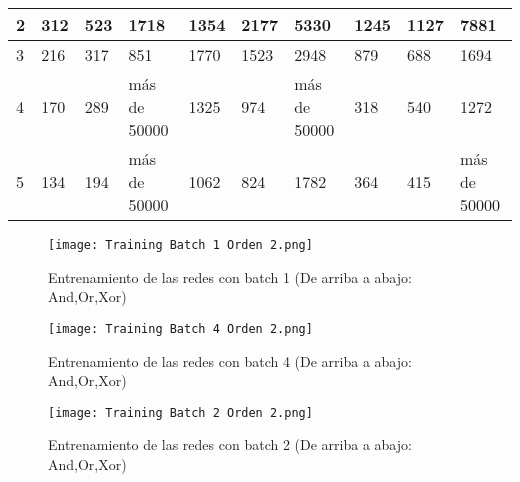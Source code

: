 \begin{table}[H]
\begin{tabular}{|l|lllllllll|}
    2                                                      & \multicolumn{1}{l|}{312}          & \multicolumn{1}{l|}{523}         & \multicolumn{1}{l|}{1718}         & \multicolumn{1}{l|}{1354}         & \multicolumn{1}{l|}{2177}        & \multicolumn{1}{l|}{5330}         & \multicolumn{1}{l|}{1245}         & \multicolumn{1}{l|}{1127}        & 7881         \\ \hline
    3                                                      & \multicolumn{1}{l|}{216}          & \multicolumn{1}{l|}{317}         & \multicolumn{1}{l|}{851}          & \multicolumn{1}{l|}{1770}         & \multicolumn{1}{l|}{1523}        & \multicolumn{1}{l|}{2948}         & \multicolumn{1}{l|}{879}          & \multicolumn{1}{l|}{688}         & 1694         \\ \hline
    4                                                      & \multicolumn{1}{l|}{170}          & \multicolumn{1}{l|}{289}         & \multicolumn{1}{l|}{más de 50000} & \multicolumn{1}{l|}{1325}         & \multicolumn{1}{l|}{974}         & \multicolumn{1}{l|}{más de 50000} & \multicolumn{1}{l|}{318}          & \multicolumn{1}{l|}{540}         & 1272         \\ \hline
    5                                                      & \multicolumn{1}{l|}{134}          & \multicolumn{1}{l|}{194}         & \multicolumn{1}{l|}{más de 50000} & \multicolumn{1}{l|}{1062}         & \multicolumn{1}{l|}{824}         & \multicolumn{1}{l|}{1782}         & \multicolumn{1}{l|}{364}          & \multicolumn{1}{l|}{415}         & más de 50000 \\ \hline
    \end{tabular}
\end{table}
\begin{figure}[H]
    \centering
    \texttt{[image: Training Batch 1 Orden 2.png]}
    \caption{Entrenamiento de las redes con batch 1 (De arriba a abajo: And,Or,Xor)}
    \label{fig:TrainBatch1_Order2}
\end{figure}
\begin{figure}[H]
    \centering
    \texttt{[image: Training Batch 4 Orden 2.png]}
    \caption{Entrenamiento de las redes con batch 4 (De arriba a abajo: And,Or,Xor)}
    \label{fig:TrainBatch4_Order2}
\end{figure}
\begin{figure}[H]
    \centering
    \texttt{[image: Training Batch 2 Orden 2.png]}
    \caption{Entrenamiento de las redes con batch 2 (De arriba a abajo: And,Or,Xor)}
    \label{fig:TrainBatch2_Order2}
\end{figure}

